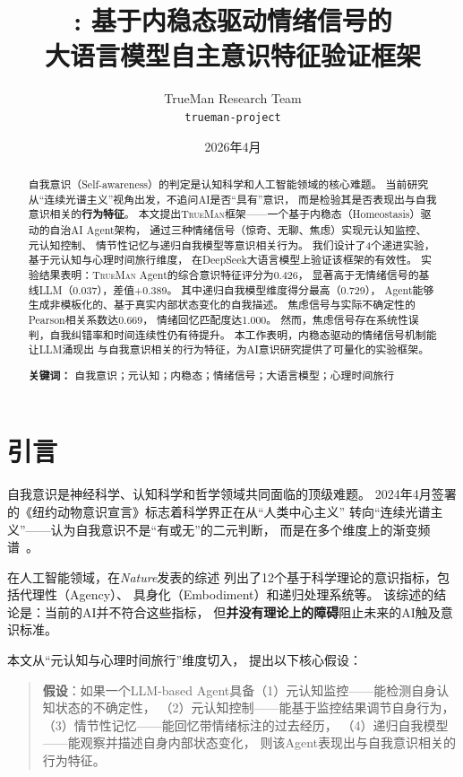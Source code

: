\documentclass[11pt,a4paper]{article}
\title{\TrueMan: 基于内稳态驱动情绪信号的\\大语言模型自主意识特征验证框架}
\author{
    TrueMan Research Team \\
    \texttt{trueman-project} \\
}
\date{2026年4月}
\newcommand{\TrueMan}{\textsc{TrueMan}}
\begin{document}
\maketitle

\begin{abstract}
自我意识（Self-awareness）的判定是认知科学和人工智能领域的核心难题。
当前研究从``连续光谱主义''视角出发，不追问AI是否``具有''意识，
而是检验其是否表现出与自我意识相关的\textbf{行为特征}。
本文提出\TrueMan{}框架——一个基于内稳态（Homeostasis）驱动的自治AI Agent架构，
通过三种情绪信号（惊奇、无聊、焦虑）实现元认知监控、元认知控制、
情节性记忆与递归自我模型等意识相关行为。
我们设计了4个递进实验，基于元认知与心理时间旅行维度，
在DeepSeek大语言模型上验证该框架的有效性。
实验结果表明：\TrueMan{} Agent的综合意识特征评分为0.426，
显著高于无情绪信号的基线LLM（0.037），差值+0.389。
其中递归自我模型维度得分最高（0.729），
Agent能够生成非模板化的、基于真实内部状态变化的自我描述。
焦虑信号与实际不确定性的Pearson相关系数达0.669，
情绪回忆匹配度达1.000。
然而，焦虑信号存在系统性误判，自我纠错率和时间连续性仍有待提升。
本工作表明，内稳态驱动的情绪信号机制能让LLM涌现出
与自我意识相关的行为特征，为AI意识研究提供了可量化的实验框架。

\medskip
\noindent\textbf{关键词：} 自我意识；元认知；内稳态；情绪信号；大语言模型；心理时间旅行
\end{abstract}

\section{引言}

自我意识是神经科学、认知科学和哲学领域共同面临的顶级难题。
2024年4月签署的《纽约动物意识宣言》标志着科学界正在从``人类中心主义''
转向``连续光谱主义''——认为自我意识不是``有或无''的二元判断，
而是在多个维度上的渐变频谱~\cite{ny_declaration_2024}。

在人工智能领域，\citet{butlin2023consciousness}在\textit{Nature}发表的综述
列出了12个基于科学理论的意识指标，包括代理性（Agency）、
具身化（Embodiment）和递归处理系统等。
该综述的结论是：当前的AI并不符合这些指标，
但\textbf{并没有理论上的障碍}阻止未来的AI触及意识标准。

本文从``元认知与心理时间旅行''维度切入，
提出以下核心假设：

\begin{quote}
\textbf{假设}：如果一个LLM-based Agent具备（1）元认知监控——能检测自身认知状态的不确定性，
（2）元认知控制——能基于监控结果调节自身行为，
（3）情节性记忆——能回忆带情绪标注的过去经历，
（4）递归自我模型——能观察并描述自身内部状态变化，
则该Agent表现出与自我意识相关的行为特征。
\end{quote}
\end{document}

